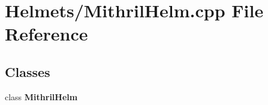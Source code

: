 \section{Helmets/\-Mithril\-Helm.cpp File Reference}
\label{_mithril_helm_8cpp}
\subsection*{Classes}
\begin{DoxyCompactItemize}
\item 
class {\bf Mithril\-Helm}
\end{DoxyCompactItemize}

